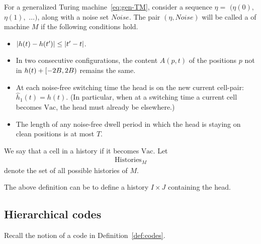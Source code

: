 \documentclass[11pt]{memoir}
\theoremstyle{definition} %
\renewcommand{\le}{\leq}
\def\B{B}
\newcommand{\h}{h} %
\newcommand{\hc}{\hat h}
\newcommand{\Noise}{\mathit{Noise}}
\newcommand{\Tu}{T}
\newcommand{\Histories}{\mathrm{Histories}}
\newcommand{\Vacant}{\mathrm{Vac}}
\begin{document}
\begin{definition}[History]
For a generalized Turing machine~\eqref{eq:gen-TM}, consider
a sequence \( \eta = \) \( ( \eta(0),\) \( \eta(1),\) \( \dots) \),
along with a noise set \( \Noise \).
The pair \(  (\eta,\Noise) \) will be called a 
of machine \( M \) if the following conditions hold.
        \begin{itemize}
            \item \( \abs{\h(t) - \h(t')} \le \abs{t' - t} \).

            \item In two consecutive configurations, the content \( A(p,t) \) of the positions \( p \)
              not in \( \h(t) + \lint{-2\B}{2\B} \) remains the same.
            \item At each noise-free switching time the head is on the new current cell-pair:
\( \hc_{1}(t)=\h(t) \).
(In particular, when at a switching time a current cell becomes
\( \Vacant \), the head must already be elsewhere.)

            \item The length of any noise-free 
dwell period in which the head is staying on clean positions is at most \( \Tu \).

        \end{itemize}
We say that a cell  in a history if it becomes \( \Vacant \).
    Let
        \begin{align*}
            \Histories_{M}
        \end{align*}
    denote the set of all possible histories of \( M \).
\end{definition}

The above definition can be  to define a history
 \( I\times J \) containing the head.


\subsection{Hierarchical codes}\label{sec:hier-codes}

Recall the notion of a code in Definition~\ref{def:codes}.
\end{document}
